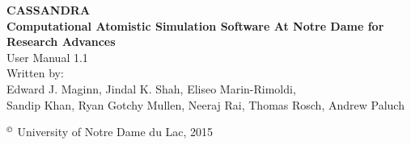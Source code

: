 \begin{center}
\vspace*{2 in}
{\huge{\bf CASSANDRA} }\\ 
\vspace{0.5in}
{\huge { \bf  Computational Atomistic Simulation Software At Notre Dame for Research Advances}} \\
\vspace{1 in}
User Manual 1.1 \\ 
\vspace{0.2in}
Written by: \\ 
\vspace{0.2in}
Edward J. Maginn, Jindal K. Shah, Eliseo Marin-Rimoldi, \\
Sandip Khan, Ryan Gotchy Mullen, Neeraj Rai, Thomas Rosch, Andrew Paluch
\end{center}
\vspace{1.5in}
$^\copyright$ University of Notre Dame du Lac, 2015

